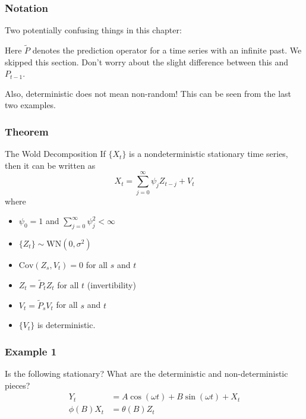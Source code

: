 \documentclass{beamer}
\begin{document}

\begin{frame}
\frametitle{Notation}

Two potentially confusing things in this chapter:
\newline

Here $\tilde{P}$ denotes the prediction operator for a time series with an infinite past. We skipped this section. Don't worry about the slight difference between this and $P_{t-1}$. 
\newline

Also, deterministic does not mean non-random! This can be seen from the last two examples.
\end{frame}


\begin{frame}
\frametitle{Theorem}

\begin{block}{The Wold Decomposition}
If $\{X_t\}$ is a nondeterministic stationary time series, then it can be written as
\[
X_t = \sum_{j=0}^{\infty}\psi_j Z_{t-j} + V_t
\]
where
\begin{itemize}
\item $\psi_0 = 1$ and $\sum_{j=0}^{\infty}\psi_j^2 < \infty$
\item $\{Z_t\} \sim \text{WN}(0,\sigma^2)$
\item $\text{Cov}(Z_s,V_t) = 0$ for all $s$ and $t$
\item $Z_t = \tilde{P}_t Z_t$ for all $t$ (invertibility)
\item $V_t = \tilde{P}_s V_t$ for all $s$ and $t$ 
\item $\{V_t\}$ is deterministic.
\end{itemize}
\end{block}

\end{frame}


\begin{frame}
\frametitle{Example 1}

Is the following stationary? What are the deterministic and non-deterministic pieces?
\begin{align*}
Y_t &= A\cos(\omega t) + B \sin(\omega t) + X_t\\
\phi(B) X_t &= \theta(B) Z_t
\end{align*}


\end{frame}
\end{document}
